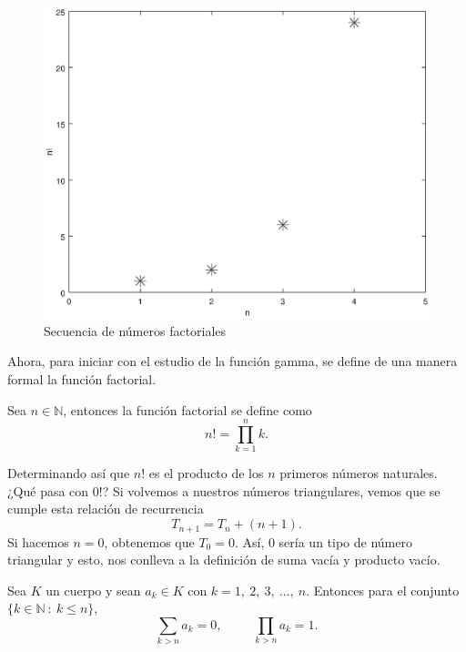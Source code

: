 \begin{figure}[htbp]
	\begin{center}
		\includegraphics[scale=0.5]{figura1_3.eps}
	\end{center}
\caption{Secuencia de números factoriales}
\label{fig1_3}
\end{figure}

Ahora, para iniciar con el estudio de la función gamma, se define de una manera formal la función factorial.
\begin{definition}
	Sea $n \in \mathbb{N}$, entonces la función factorial se define como $$n! = \prod_{k=1}^{n} k.$$
\end{definition}

Determinando así que $n!$ es el producto de los $n$ primeros números naturales. ¿Qué pasa con $0!$? Si volvemos a nuestros números triangulares, vemos que se cumple esta relación de recurrencia $$T_{n+1} = T_n + (n+1).$$ Si hacemos $n = 0$, obtenemos que $T_0 = 0.$ Así, $0$ sería un tipo de número triangular y esto, nos conlleva a la definición de suma vacía y producto vacío. 

\begin{definition}
		Sea $K$ un cuerpo y sean $a_k \in K$ con $k = 1,\ 2,\ 3,\ \dots,\ n$. Entonces para el conjunto $\{k \in \mathbb{N}\ :\ k\leq n\}$, $$\sum_{k>n} a_k = 0, \hspace{1cm} \prod_{k>n} a_k = 1.$$
\end{definition}


